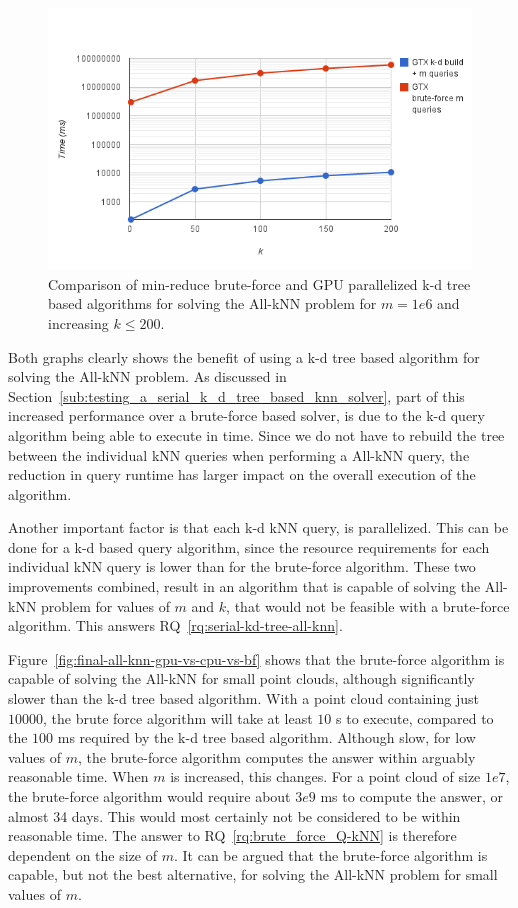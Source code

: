 \begin{figure}[ht!]
    \centering
    \includegraphics[width=120mm]{../gfx/final-var-all-knn-kd-vs-bf.png}
    \caption{Comparison of min-reduce brute-force and GPU parallelized k-d tree based algorithms for solving the All-kNN problem for $m=1e6$ and increasing $k\le200$.}
    \label{fig:final-var-all-knn-kd-vs-bf}
\end{figure}

Both graphs clearly shows the benefit of using a k-d tree based algorithm for solving the All-kNN problem. As discussed in Section~\ref{sub:testing_a_serial_k_d_tree_based_knn_solver}, part of this increased performance over a brute-force based solver, is due to the k-d query algorithm being able to execute in  time. Since we do not have to rebuild the tree between the individual kNN queries when performing a All-kNN query, the reduction in query runtime has larger impact on the overall execution of the algorithm.

Another important factor is that each k-d kNN query, is parallelized. This can be done for a k-d based query algorithm, since the resource requirements for each individual kNN query is lower than for the brute-force algorithm. These two improvements combined, result in an algorithm that is capable of solving the All-kNN problem for values of $m$ and $k$, that would not be feasible with a brute-force algorithm. This answers RQ~\ref{rq:serial-kd-tree-all-knn}.

Figure~\ref{fig:final-all-knn-gpu-vs-cpu-vs-bf} shows that the brute-force algorithm is capable of solving the All-kNN for small point clouds, although significantly slower than the k-d tree based algorithm. With a point cloud containing just $10000$, the brute force algorithm will take at least $10$ s to execute, compared to the $100$ ms required by the k-d tree based algorithm. Although slow, for low values of $m$, the brute-force algorithm computes the answer within arguably reasonable time. When $m$ is increased, this changes. For a point cloud of size $1e7$, the brute-force algorithm would require about $3e9$ ms to compute the answer, or almost 34 days. This would most certainly not be considered to be within reasonable time. The answer to RQ~\ref{rq:brute_force_Q-kNN} is therefore dependent on the size of $m$. It can be argued that the brute-force algorithm is capable, but not the best alternative, for solving the All-kNN problem for small values of $m$.

